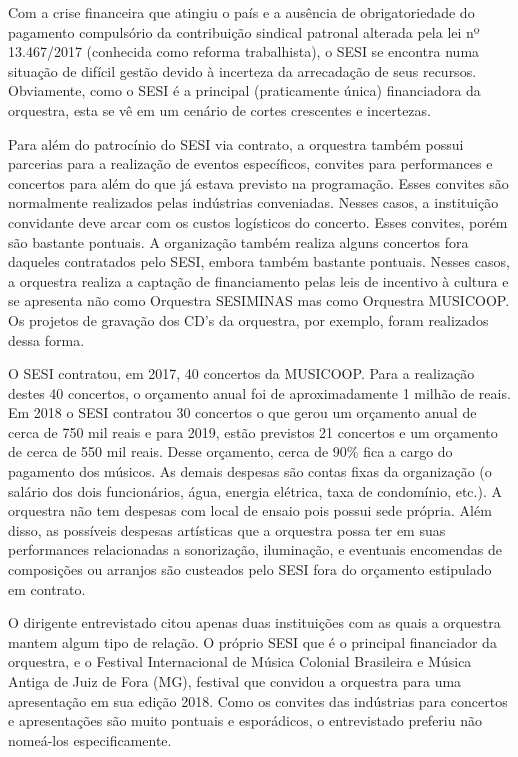 \documentclass[a4paper, 12pt, openright, oneside, german, french, english, brazil]{abntex2}
\begin{document}
	Com a crise financeira que atingiu o país e a ausência de obrigatoriedade do pagamento compulsório da contribuição sindical patronal alterada pela lei nº 13.467/2017 (conhecida como reforma trabalhista), o SESI se encontra numa situação de difícil gestão devido à incerteza da arrecadação de seus recursos. Obviamente, como o SESI é a principal (praticamente única) financiadora da orquestra, esta se vê em um cenário de cortes crescentes e incertezas. 
	
	Para além do patrocínio do SESI via contrato, a orquestra também possui parcerias para a realização de eventos específicos, convites para performances e concertos para além do que já estava previsto na programação. Esses convites são normalmente realizados pelas indústrias conveniadas. Nesses casos, a instituição convidante deve arcar com os custos logísticos do concerto. Esses convites, porém são bastante pontuais. A organização também realiza alguns concertos fora daqueles contratados pelo SESI, embora também bastante pontuais. Nesses casos, a orquestra realiza a captação de financiamento pelas leis de incentivo à cultura e se apresenta não como Orquestra SESIMINAS mas como Orquestra MUSICOOP. Os projetos de gravação dos CD's da orquestra, por exemplo, foram realizados dessa forma.
	
	O SESI contratou, em 2017, 40 concertos da MUSICOOP. Para a realização destes 40 concertos, o orçamento anual foi de aproximadamente 1 milhão de reais. Em 2018 o SESI contratou 30 concertos o que gerou um orçamento anual de cerca de 750 mil reais e para 2019, estão previstos 21 concertos e um orçamento de cerca de 550 mil reais. Desse orçamento, cerca de 90\% fica a cargo do pagamento dos músicos. As demais despesas são contas fixas da organização (o salário dos dois funcionários, água, energia elétrica, taxa de condomínio, etc.). A orquestra não tem despesas com local de ensaio pois possui sede própria. Além disso, as possíveis despesas artísticas que a orquestra possa ter em suas performances relacionadas a sonorização, iluminação, e eventuais encomendas de composições ou arranjos são custeados pelo SESI fora do orçamento estipulado em contrato.
	
	O dirigente entrevistado citou apenas duas instituições com as quais a orquestra mantem algum tipo de relação. O próprio SESI que é o principal financiador da orquestra, e o Festival Internacional de Música Colonial Brasileira e Música Antiga de Juiz de Fora (MG), festival que convidou a orquestra para uma apresentação em sua edição 2018. Como os convites das indústrias para concertos e apresentações são muito pontuais e esporádicos, o entrevistado preferiu não nomeá-los especificamente. 
	
\end{document}
